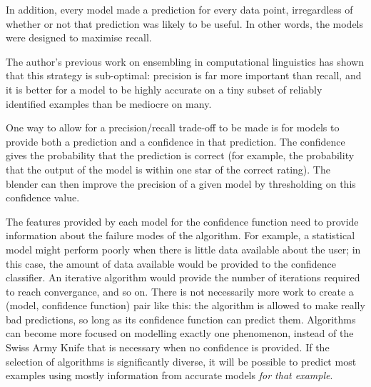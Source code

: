\documentclass{article}
\begin{document}
In addition, every model made a prediction for every data point, irregardless of whether or not that prediction was likely to be useful.  In other words, the models were designed to maximise recall.

The author's previous work on ensembling in computational linguistics has shown that this strategy is sub-optimal: precision is far more important than recall, and it is better for a model to be highly accurate on a tiny subset of reliably identified examples than be mediocre on many.

One way to allow for a precision/recall trade-off to be made is for models to provide both a prediction and a confidence in that prediction.  The confidence gives the probability that the prediction is correct (for example, the probability that the output of the model is within one star of the correct rating).  The blender can then improve the precision of a given model by thresholding on this confidence value.

The features provided by each model for the confidence function need to provide information about the failure modes of the algorithm.  For example, a statistical model might perform poorly when there is little data available about the user; in this case, the amount of data available would be provided to the confidence classifier.  An iterative algorithm would provide the number of iterations required to reach convergance, and so on.  There is not necessarily more work to create a (model, confidence function) pair like this: the algorithm is allowed to make really bad predictions, so long as its confidence function can predict them.  Algorithms can become more focused on modelling exactly one phenomenon, instead of the Swiss Army Knife that is necessary when no confidence is provided.  If the selection of algorithms is significantly diverse, it will be possible to predict most examples using mostly information from accurate models \emph{for that example}.
\end{document}
